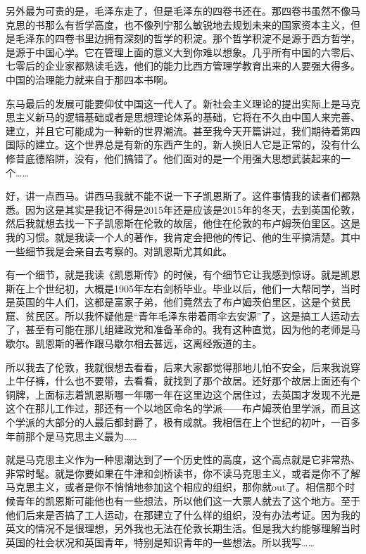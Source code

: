 \documentclass[UTF8, 12pt, a4paper]{ctexrep}
\begin{document}
另外最为可贵的是，毛泽东走了，但是毛泽东的四卷书还在。那四卷书虽然不像马克思的书那么有哲学高度，也不像列宁那么敏锐地去规划未来的国家资本主义，但是毛泽东的四卷书里边拥有深刻的哲学的积淀。那个哲学积淀不是源于西方哲学，是源于中国心学。它在管理上面的意义大到你难以想象。几乎所有中国的六零后、七零后的企业家都熟读毛选，他们的能力比西方管理学教育出来的人要强大得多。中国的治理能力就来自于那四本书啊。

东马最后的发展可能要仰仗中国这一代人了。新社会主义理论的提出实际上是马克思主义新马的逻辑基础或者是思想理论体系的基础，它将在不久由中国人来完善、建立，并且它可能成为一种新的世界潮流。甚至我今天开篇讲过，我们期待着第四国际的建立。这个世界总是有新的东西产生的，新人换旧人它是正常的，没有什么修昔底德陷阱，没有，他们搞错了。他们面对的是一个用强大思想武装起来的一个……

好，讲一点西马。讲西马我就不能不说一下子凯恩斯了。这件事情我的读者们都熟悉。因为这是其实是我记不得是2015年还是应该是2015年的冬天，去到英国伦敦，然后我就想去找一下子凯恩斯在伦敦的故居，他住在伦敦的布卢姆茨伯里区。这是我的习惯。就是我读一个人的著作，我肯定会把他的传记、他的生平搞清楚。其中一些细节我是会亲自去考察的。对凯恩斯尤其如此。

有一个细节，就是我读《凯恩斯传》的时候，有个细节它让我感到惊讶。就是凯恩斯在上个世纪初，大概是1905年左右剑桥毕业。毕业以后，他们一大帮同学，当时是英国的牛人们，这都是富家子弟，他们竟然去了布卢姆茨伯里区，这是个贫民窟、贫民区。所以我怀疑他是“青年毛泽东带着雨伞去安源”了，这是搞工人运动去了，甚至有可能在那儿组建政党和准备革命的。我有这种直觉，因为他的老师是马歇尔。凯恩斯的著作跟马歇尔相去甚远，这离经叛道的主。

所以我去了伦敦，我就很想去看看，后来大家都觉得那地儿怕不安全，后来我说穿上牛仔裤，什么也不要带，去看看，就找到了那个故居。还好那个故居上面还有个铜牌，上面标志着凯恩斯哪一年哪一年在这里边这个居住过，去英国才发现不光是这个在那儿工作过，那还有一个以地区命名的学派——布卢姆茨伯里学派，而且这个学派的大部分的人最后都封爵了，极有成就。我相信在上个世纪的初叶，一百多年前那个是马克思主义最为……

就是马克思主义作为一种思潮达到了一个历史性的高度，这个高点就是它非常热、非常时髦。就是你要如果在牛津和剑桥读书，你不读马克思主义，或者是你不了解马克思主义，或者是你不悄悄地参加这个相应的组织，那你就out了。相信那个时候青年的凯恩斯可能他也有一些想法，所以他们这一大票人就去了这个地方。至于他们后来是否搞了工人运动，在那建立了什么样的组织，没有办法考证。因为我的英文的情况不是很理想，另外我也无法在伦敦长期生活。但是我大约能够理解当时英国的社会状况和英国青年，特别是知识青年的一些想法。所以我写……
\end{document}
